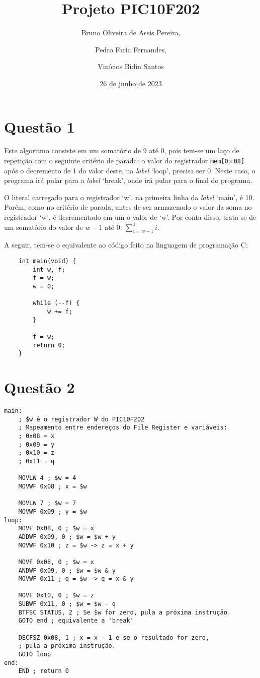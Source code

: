 \documentclass[12pt]{report}
\title{Projeto PIC10F202}
\author{Bruno Oliveira de Assis Pereira,\and Pedro Faria Fernandes,\and Vinícios Bidin Santos}
\date{26 de junho de 2023}
\begin{document}
	\maketitle
	\section*{Questão 1}
		Este algoritmo consiste em um somatório de 9 até 0, pois tem-se um laço de repetição com o seguinte critério de parada: o valor do registrador \texttt{mem[0$\times$08]}
		após o decremento de 1 do valor deste, na \textit{label} `loop', precisa ser 0. Neste caso, o programa irá pular para a \textit{label} `break', onde irá pular para o final do programa.

		O literal carregado para o registrador `w', na primeira linha da \textit{label} `main', é 10. Porém, como no critério de parada, antes de ser armazenado o valor da soma no registrador `w', é decrementado em um o valor de `w'. Por conta disso, trata-se de um somatório do valor de $w - 1$ até 0: $\sum\limits_{i=w-1}^{1}i$.

		A seguir, tem-se o equivalente ao código feito na linguagem de programação C:\@
	\begin{verbatim}
	int main(void) {
		int w, f;
		f = w;
		w = 0;

		while (--f) {
			w += f;
		}

		f = w;
		return 0;
	}
	\end{verbatim}
	\clearpage
	\section*{Questão 2}
		\begin{verbatim}
main:
    ; $w é o registrador W do PIC10F202
    ; Mapeamento entre endereços do File Register e variáveis: 
    ; 0x08 = x
    ; 0x09 = y
    ; 0x10 = z
    ; 0x11 = q

    MOVLW 4 ; $w = 4
    MOVWF 0x08 ; x = $w

    MOVLW 7 ; $w = 7
    MOVWF 0x09 ; y = $w
loop:
    MOVF 0x08, 0 ; $w = x
    ADDWF 0x09, 0 ; $w = $w + y
    MOVWF 0x10 ; z = $w -> z = x + y
		
    MOVF 0x08, 0 ; $w = x
    ANDWF 0x09, 0 ; $w = $w & y
    MOVWF 0x11 ; q = $w -> q = x & y
		
    MOVF 0x10, 0 ; $w = z
    SUBWF 0x11, 0 ; $w = $w - q
    BTFSC STATUS, 2 ; Se $w for zero, pula a próxima instrução. 
    GOTO end ; equivalente a 'break'
		
    DECFSZ 0x08, 1 ; x = x - 1 e se o resultado for zero,
    ; pula a próxima instrução.
    GOTO loop
end:
    END ; return 0
		\end{verbatim}
\end{document}
